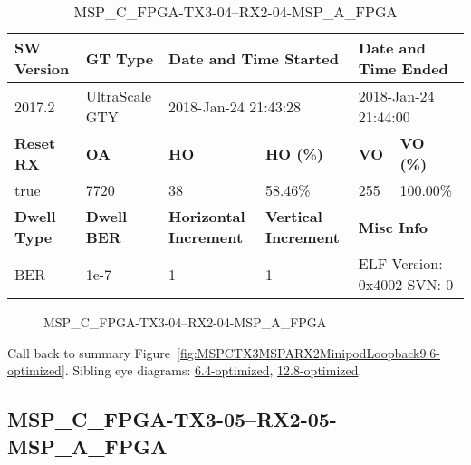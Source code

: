 \begin{table}[h]
\centering
\caption{MSP\_C\_FPGA-TX3-04--RX2-04-MSP\_A\_FPGA}
\label{tab:MSPCFPGATX304RX204MSPAFPGA9.6-optimized}
\begin{tabular}{@{}|l|l|l|l|l|l|@{}}
\toprule
\textbf{SW Version}                & \textbf{GT Type}   & \multicolumn{2}{l|}{\textbf{Date and Time Started}}            & \multicolumn{2}{l|}{\textbf{Date and Time Ended}}        \\ \midrule
2017.2                       & UltraScale GTY          & \multicolumn{2}{l|}{2018-Jan-24 21:43:28}                   & \multicolumn{2}{l|}{2018-Jan-24 21:44:00}               \\ \midrule
\textbf{Reset RX}                  & \textbf{OA} & \textbf{HO}   & \textbf{HO (\%)} & \textbf{VO} & \textbf{VO (\%)} \\ \midrule
true & 7720        & 38          & 58.46\%        & 255        & 100.00\%       \\ \midrule
\textbf{Dwell Type}                & \textbf{Dwell BER} & \textbf{Horizontal Increment} & \textbf{Vertical Increment}    & \multicolumn{2}{l|}{\textbf{Misc Info}}                  \\ \midrule
BER                            & 1e-7        & 1        & 1           & \multicolumn{2}{l|}{ELF Version: 0x4002 SVN: 0}                         \\ \bottomrule
\end{tabular}
\end{table}

\begin{figure}[h]
\caption{MSP\_C\_FPGA-TX3-04--RX2-04-MSP\_A\_FPGA} \label{fig:MSPCFPGATX304RX204MSPAFPGA9.6-optimized}
\end{figure}

Call back to summary Figure~\ref{fig:MSPCTX3MSPARX2MinipodLoopback9.6-optimized}.
Sibling eye diagrams: \hyperref[sec:MSPCFPGATX304RX204MSPAFPGA6.4-optimized]{6.4-optimized}, \hyperref[sec:MSPCFPGATX304RX204MSPAFPGA12.8-optimized]{12.8-optimized}.

\clearpage
\newpage


\subsection{MSP\_C\_FPGA-TX3-05--RX2-05-MSP\_A\_FPGA}\label{sec:MSPCFPGATX305RX205MSPAFPGA9.6-optimized}

